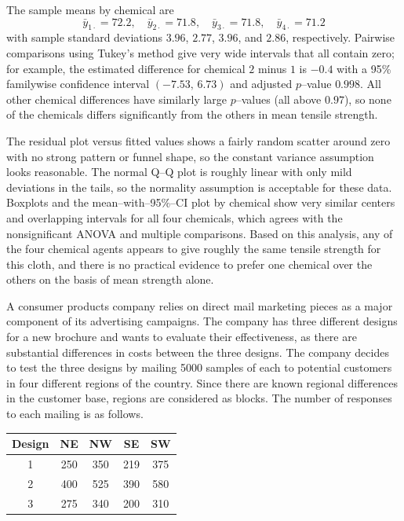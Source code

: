 \documentclass[answers,12pt,addpoints]{exam}
\begin{document}
\begin{questions}
\begin{solution}
The sample means by chemical are
\[
\bar{y}_{1\cdot} = 72.2,\quad
\bar{y}_{2\cdot} = 71.8,\quad
\bar{y}_{3\cdot} = 71.8,\quad
\bar{y}_{4\cdot} = 71.2
\]
with sample standard deviations $3.96$, $2.77$, $3.96$, and $2.86$, respectively. Pairwise comparisons using Tukey’s method give very wide intervals that all contain zero; for example, the estimated difference for chemical $2$ minus $1$ is $-0.4$ with a 95\% familywise confidence interval $(-7.53,\,6.73)$ and adjusted $p$–value $0.998$. All other chemical differences have similarly large $p$–values (all above $0.97$), so none of the chemicals differs significantly from the others in mean tensile strength.

The residual plot versus fitted values shows a fairly random scatter around zero with no strong pattern or funnel shape, so the constant variance assumption looks reasonable. The normal Q–Q plot is roughly linear with only mild deviations in the tails, so the normality assumption is acceptable for these data. Boxplots and the mean–with–95\%–CI plot by chemical show very similar centers and overlapping intervals for all four chemicals, which agrees with the nonsignificant ANOVA and multiple comparisons. Based on this analysis, any of the four chemical agents appears to give roughly the same tensile strength for this cloth, and there is no practical evidence to prefer one chemical over the others on the basis of mean strength alone.
\end{solution}

 A consumer products company relies on direct mail marketing pieces as a major component of its advertising campaigns. The company has three different designs for a new brochure and wants to evaluate their effectiveness, as there are substantial differences in costs between the three designs. The company decides to test the three designs by mailing 5000 samples of each to potential customers in four different regions of the country. Since there are known regional differences in the customer base, regions are considered as blocks. The number of responses to each mailing is as follows.

\begin{center}
\begin{tabular}{c|cccc}
\hline
Design & NE & NW & SE & SW \\
\hline
1 & 250 & 350 & 219 & 375 \\
2 & 400 & 525 & 390 & 580 \\
3 & 275 & 340 & 200 & 310 \\
\hline
\end{tabular}
\end{center}


\end{questions}
\end{document}

